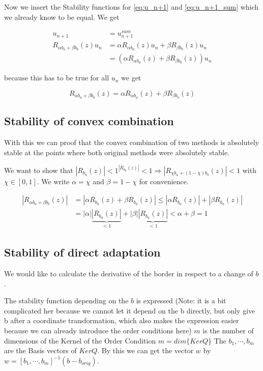 \documentclass{article}
\begin{document}
Now we insert the Stability functions for \ref{eq:u_n+1} and \ref{eq:u_n+1_sum} which we already know to be equal. We get 

\begin{align}
u_{n+1} &= u_{n+1}^{sum} \\
R_{\alpha b_a+\beta b_b}(z) u_n &= \alpha R_{\alpha b_a}(z) u_n + \beta R_{\beta b_b}(z) u_n \\
&= (\alpha R_{\alpha b_a}(z) + \beta R_{\beta b_b}(z)) u_n
\end{align}

because this has to be true for all $u_n$ we get

\begin{equation}
R_{\alpha b_a+\beta b_b}(z) = \alpha R_{\alpha b_a}(z) + \beta R_{\beta b_b}(z) 
\end{equation}

\subsection{Stability of convex combination}\label{proof:convex_comb}

With this we can proof that the convex combination of two methods is absolutely stable at the points where both original methods were absolutely stable.

We want to show that $|R_{b_a}(z)|  < 1 ^ |R_{b_b}(z)| < 1\Rightarrow |R_{\chi b_a +(1- \chi) b_b}(z)| < 1$ with $\chi \in [0,1]$.
We write $\alpha = \chi$ and $\beta = 1-\chi$ for convenience.

\begin{align}
|R_{\alpha b_a +\beta b_b}(z)| &= |\alpha R_{b_a}(z) + \beta R_{b_a}(z)| \leq |\alpha R_{b_a}(z)| + |\beta R_{b_a}(z)|\\
 &=| \alpha| \underbrace{|R_{b_a}(z)|}_{<1} + |\beta| \underbrace{|R_{b_a}(z)|}_{<1} < \alpha + \beta = 1
\end{align}


\subsection{Stability of direct adaptation}

We would like to calculate the derivative of the border in respect to a change of $b$. 



The stability function depending on the $b$ is expressed (Note: it is a bit complicated her because we cannot let it depend on the b directly, but only give b after a coordinate transformation, which also makes the expression easier because we can already introduce the order conditions here)
$m$ is the number of dimensions of the Kernel of the Order Condition $m = dim\{Ker Q \}$
The $b_1,\cdots,b_m$  are the Basis vectors of $Ker Q$. By this we can get the vector $w$ by $w = \left[b_1,\cdots,b_m\right]^{-1}(b-b_{orig})$.
\end{document}
